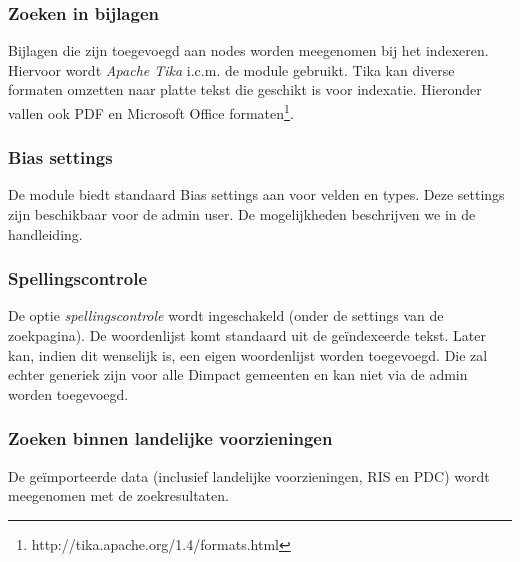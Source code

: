 \subsubsection{Zoeken in bijlagen}
Bijlagen die zijn toegevoegd aan nodes worden meegenomen bij het indexeren. Hiervoor wordt \emph{Apache Tika} i.c.m. de  module gebruikt. Tika kan diverse formaten omzetten naar platte tekst die geschikt is voor indexatie. Hieronder vallen ook PDF en Microsoft Office formaten\footnote{http://tika.apache.org/1.4/formats.html}.

\subsubsection{Bias settings}
De  module biedt standaard Bias settings aan voor velden en types. Deze settings zijn beschikbaar voor de admin user. De mogelijkheden beschrijven we in de handleiding.

\subsubsection{Spellingscontrole}
De optie \emph{spellingscontrole} wordt ingeschakeld (onder de settings van de zoekpagina). De woordenlijst komt standaard uit de ge\"{i}ndexeerde tekst. Later kan, indien dit wenselijk is, een eigen woordenlijst worden toegevoegd. Die zal echter generiek zijn voor alle Dimpact gemeenten en kan niet via de admin worden toegevoegd.

\subsubsection{Zoeken binnen landelijke voorzieningen}
De ge\"{i}mporteerde data (inclusief landelijke voorzieningen, RIS en PDC) wordt meegenomen met de zoekresultaten. 

